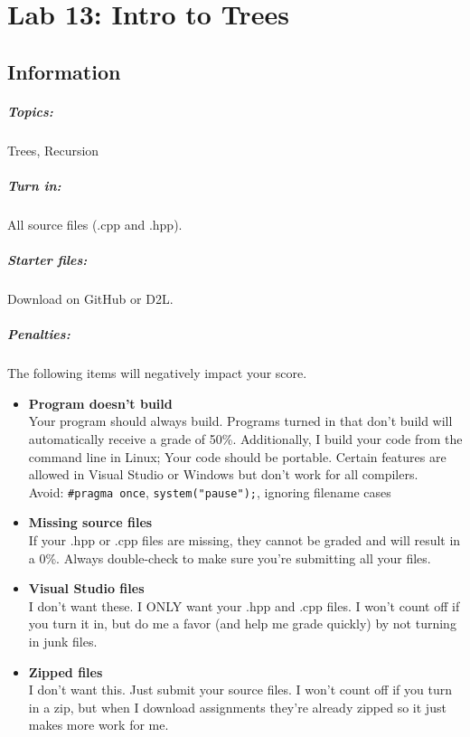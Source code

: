 \documentclass[a4paper,12pt,oneside]{book}
\title{}
\author{Rachel Morris}
\date{\today}
\newcommand{\laLab}{Lab 13: Intro to Trees\ }
\begin{document}
    \chapter*{\laLab} 

        \section{Information}
            \paragraph{ Topics: } Trees, Recursion
            \paragraph{ Turn in: } All source files (.cpp and .hpp).
            \paragraph{ Starter files: } Download on GitHub or D2L.


            \paragraph{ Penalties: }
                The following items will negatively impact your score.

                \begin{itemize}
                    \item   \textbf{Program doesn't build}
                        \\ Your program should always build. Programs turned in that don't build will automatically receive a grade of 50\%.{}
                            Additionally, I build your code from the command line in Linux; Your code should be portable. Certain features
                            are allowed in Visual Studio or Windows but don't work for all compilers. \\
                            \footnotesize Avoid: \texttt{\#pragma once}, \texttt{system("pause");}, ignoring filename cases
                            \normalsize 
                    \item   \textbf{Missing source files}
                        \\ If your .hpp or .cpp files are missing, they cannot be graded and will result in a 0\%. Always double-check to make sure you're submitting all your files.
                    \item   \textbf{Visual Studio files}
                        \\ I don't want these. I ONLY want your .hpp and .cpp files. I won't count off if you turn it in, but do me a favor (and help me grade quickly) by not turning in junk files.
                    \item   \textbf{Zipped files}
                        \\ I don't want this. Just submit your source files. I won't count off if you turn in a zip, but when I download assignments they're already zipped so it just makes more work for me.
                \end{itemize}
\end{document}
